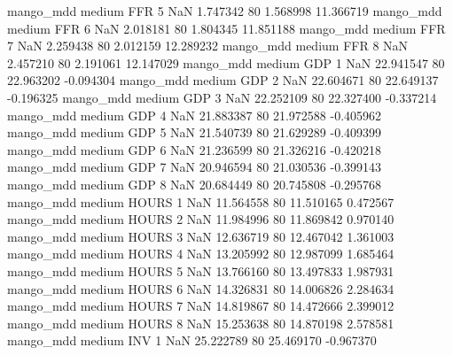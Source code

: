         mango_mdd     medium      FFR                 5                  NaN  1.747342 80       1.568998          11.366719
        mango_mdd     medium      FFR                 6                  NaN  2.018181 80       1.804345          11.851188
        mango_mdd     medium      FFR                 7                  NaN  2.259438 80       2.012159          12.289232
        mango_mdd     medium      FFR                 8                  NaN  2.457210 80       2.191061          12.147029
        mango_mdd     medium      GDP                 1                  NaN 22.941547 80      22.963202          -0.094304
        mango_mdd     medium      GDP                 2                  NaN 22.604671 80      22.649137          -0.196325
        mango_mdd     medium      GDP                 3                  NaN 22.252109 80      22.327400          -0.337214
        mango_mdd     medium      GDP                 4                  NaN 21.883387 80      21.972588          -0.405962
        mango_mdd     medium      GDP                 5                  NaN 21.540739 80      21.629289          -0.409399
        mango_mdd     medium      GDP                 6                  NaN 21.236599 80      21.326216          -0.420218
        mango_mdd     medium      GDP                 7                  NaN 20.946594 80      21.030536          -0.399143
        mango_mdd     medium      GDP                 8                  NaN 20.684449 80      20.745808          -0.295768
        mango_mdd     medium    HOURS                 1                  NaN 11.564558 80      11.510165           0.472567
        mango_mdd     medium    HOURS                 2                  NaN 11.984996 80      11.869842           0.970140
        mango_mdd     medium    HOURS                 3                  NaN 12.636719 80      12.467042           1.361003
        mango_mdd     medium    HOURS                 4                  NaN 13.205992 80      12.987099           1.685464
        mango_mdd     medium    HOURS                 5                  NaN 13.766160 80      13.497833           1.987931
        mango_mdd     medium    HOURS                 6                  NaN 14.326831 80      14.006826           2.284634
        mango_mdd     medium    HOURS                 7                  NaN 14.819867 80      14.472666           2.399012
        mango_mdd     medium    HOURS                 8                  NaN 15.253638 80      14.870198           2.578581
        mango_mdd     medium      INV                 1                  NaN 25.222789 80      25.469170          -0.967370

